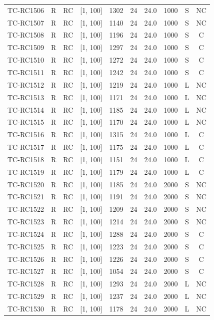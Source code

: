 \begin{longtable}{lccccccccc}
TC-RC1506 & R & RC & [1, 100] & 1302 & 24 & 24.0 & 1000 & S & NC \\
TC-RC1507 & R & RC & [1, 100] & 1140 & 24 & 24.0 & 1000 & S & NC \\
TC-RC1508 & R & RC & [1, 100] & 1196 & 24 & 24.0 & 1000 & S & C \\
TC-RC1509 & R & RC & [1, 100] & 1297 & 24 & 24.0 & 1000 & S & C \\
TC-RC1510 & R & RC & [1, 100] & 1272 & 24 & 24.0 & 1000 & S & C \\
TC-RC1511 & R & RC & [1, 100] & 1242 & 24 & 24.0 & 1000 & S & C \\
TC-RC1512 & R & RC & [1, 100] & 1219 & 24 & 24.0 & 1000 & L & NC \\
TC-RC1513 & R & RC & [1, 100] & 1171 & 24 & 24.0 & 1000 & L & NC \\
TC-RC1514 & R & RC & [1, 100] & 1185 & 24 & 24.0 & 1000 & L & NC \\
TC-RC1515 & R & RC & [1, 100] & 1170 & 24 & 24.0 & 1000 & L & NC \\
TC-RC1516 & R & RC & [1, 100] & 1315 & 24 & 24.0 & 1000 & L & C \\
TC-RC1517 & R & RC & [1, 100] & 1175 & 24 & 24.0 & 1000 & L & C \\
TC-RC1518 & R & RC & [1, 100] & 1151 & 24 & 24.0 & 1000 & L & C \\
TC-RC1519 & R & RC & [1, 100] & 1179 & 24 & 24.0 & 1000 & L & C \\
TC-RC1520 & R & RC & [1, 100] & 1185 & 24 & 24.0 & 2000 & S & NC \\
TC-RC1521 & R & RC & [1, 100] & 1191 & 24 & 24.0 & 2000 & S & NC \\
TC-RC1522 & R & RC & [1, 100] & 1209 & 24 & 24.0 & 2000 & S & NC \\
TC-RC1523 & R & RC & [1, 100] & 1214 & 24 & 24.0 & 2000 & S & NC \\
TC-RC1524 & R & RC & [1, 100] & 1288 & 24 & 24.0 & 2000 & S & C \\
TC-RC1525 & R & RC & [1, 100] & 1223 & 24 & 24.0 & 2000 & S & C \\
TC-RC1526 & R & RC & [1, 100] & 1226 & 24 & 24.0 & 2000 & S & C \\
TC-RC1527 & R & RC & [1, 100] & 1054 & 24 & 24.0 & 2000 & S & C \\
TC-RC1528 & R & RC & [1, 100] & 1293 & 24 & 24.0 & 2000 & L & NC \\
TC-RC1529 & R & RC & [1, 100] & 1237 & 24 & 24.0 & 2000 & L & NC \\
TC-RC1530 & R & RC & [1, 100] & 1178 & 24 & 24.0 & 2000 & L & NC \\

\end{longtable}
